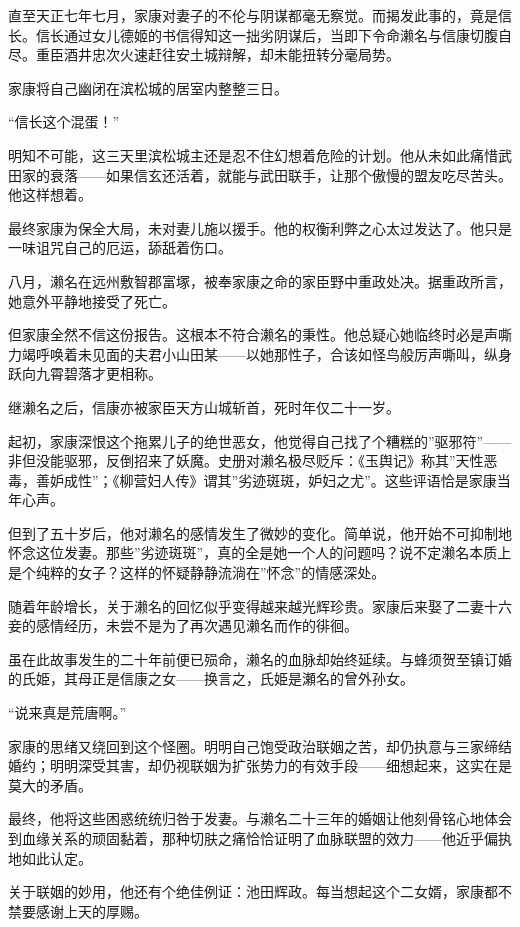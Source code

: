 \documentclass[
]{book}
\begin{document}
直至天正七年七月，家康对妻子的不伦与阴谋都毫无察觉。而揭发此事的，竟是信长。信长通过女儿德姬的书信得知这一拙劣阴谋后，当即下令命濑名与信康切腹自尽。重臣酒井忠次火速赶往安土城辩解，却未能扭转分毫局势。

家康将自己幽闭在滨松城的居室内整整三日。

``信长这个混蛋！''

明知不可能，这三天里滨松城主还是忍不住幻想着危险的计划。他从未如此痛惜武田家的衰落------如果信玄还活着，就能与武田联手，让那个傲慢的盟友吃尽苦头。他这样想着。

最终家康为保全大局，未对妻儿施以援手。他的权衡利弊之心太过发达了。他只是一味诅咒自己的厄运，舔舐着伤口。

八月，濑名在远州敷智郡富塚，被奉家康之命的家臣野中重政处决。据重政所言，她意外平静地接受了死亡。

但家康全然不信这份报告。这根本不符合濑名的秉性。他总疑心她临终时必是声嘶力竭呼唤着未见面的夫君小山田某------以她那性子，合该如怪鸟般厉声嘶叫，纵身跃向九霄碧落才更相称。

继濑名之后，信康亦被家臣天方山城斩首，死时年仅二十一岁。

起初，家康深恨这个拖累儿子的绝世恶女，他觉得自己找了个糟糕的''驱邪符''------非但没能驱邪，反倒招来了妖魔。史册对濑名极尽贬斥：《玉舆记》称其''天性恶毒，善妒成性''；《柳营妇人传》谓其''劣迹斑斑，妒妇之尤''。这些评语恰是家康当年心声。

但到了五十岁后，他对濑名的感情发生了微妙的变化。简单说，他开始不可抑制地怀念这位发妻。那些''劣迹斑斑''，真的全是她一个人的问题吗？说不定濑名本质上是个纯粹的女子？这样的怀疑静静流淌在''怀念''的情感深处。

随着年龄增长，关于濑名的回忆似乎变得越来越光辉珍贵。家康后来娶了二妻十六妾的感情经历，未尝不是为了再次遇见濑名而作的徘徊。

虽在此故事发生的二十年前便已殒命，濑名的血脉却始终延续。与蜂须贺至镇订婚的氏姫，其母正是信康之女------换言之，氏姫是瀬名的曾外孙女。

``说来真是荒唐啊。''

家康的思绪又绕回到这个怪圈。明明自己饱受政治联姻之苦，却仍执意与三家缔结婚约；明明深受其害，却仍视联姻为扩张势力的有效手段------细想起来，这实在是莫大的矛盾。

最终，他将这些困惑统统归咎于发妻。与濑名二十三年的婚姻让他刻骨铭心地体会到血缘关系的顽固黏着，那种切肤之痛恰恰证明了血脉联盟的效力------他近乎偏执地如此认定。

关于联姻的妙用，他还有个绝佳例证：池田辉政。每当想起这个二女婿，家康都不禁要感谢上天的厚赐。
\end{document}
